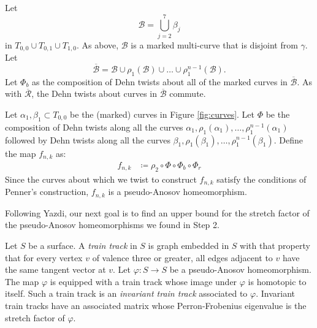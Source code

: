 Let $$\mathcal{B}=\displaystyle\bigcup_{j=2}^7\beta_j$$ in $T_{0,0} \cup T_{0,1} \cup T_{1,0}$. As above, $\mathcal{B}$ is a marked multi-curve that is disjoint from $\gamma$.  Let $$\overline{\mathcal{B}} = \mathcal{B} \cup \rho_1(\mathcal{B}) \cup \dots \cup
\rho_1^{n-1}(\mathcal{B}).$$
Let $\Phi_b$
as the composition of Dehn twists about all of the marked curves in $\overline{\mathcal{B}}$.
As with $\overline{\mathcal{R}}$, the Dehn twists about curves in $\overline{\mathcal{B}}$ 
commute.




Let $\alpha_1,\beta_1 \subset T_{0,0}$ be the (marked) curves in Figure \ref{fig:curves}. Let $\Phi$ be the composition
of Dehn twists along all the curves $\alpha_1, \rho_1(\alpha_1), \dots, \rho_1^{n-1}(\alpha_1)$ followed by
Dehn twists along all the curves $\beta_1,\rho_1(\beta_1),\dots,\rho_1^{n-1}(\beta_1)$. Define the map $f_{n,k}$
as:
\begin{align*}
    f_{n,k} &\coloneqq \rho_2 \circ \Phi \circ \Phi_b \circ \Phi_r
\end{align*}
Since the curves about which we twist to construct $f_{n,k}$ satisfy the conditions of Penner's construction, $f_{n,k}$ is a pseudo-Anosov homeomorphism.%

Following Yazdi, our next goal is to find an upper bound for the stretch factor of the pseudo-Anosov homeomorphisms we found in Step 2.

 Let $S$ be a surface.  A \textit{train track} in $S$ is graph embedded in $S$ with that property that for every vertex $v$ of valence three or greater, all edges adjacent to $v$ have the same tangent vector at $v$. Let $\varphi:S\rightarrow S$ be a pseudo-Anosov homeomorphism.  The map $\varphi$ is equipped with a train track whose image under $\varphi$ is homotopic to itself.  Such a train track is an \textit{invariant train track} associated to $\varphi$. Invariant train tracks have an associated matrix whose Perron-Frobenius eigenvalue is the stretch factor of $\varphi$.

